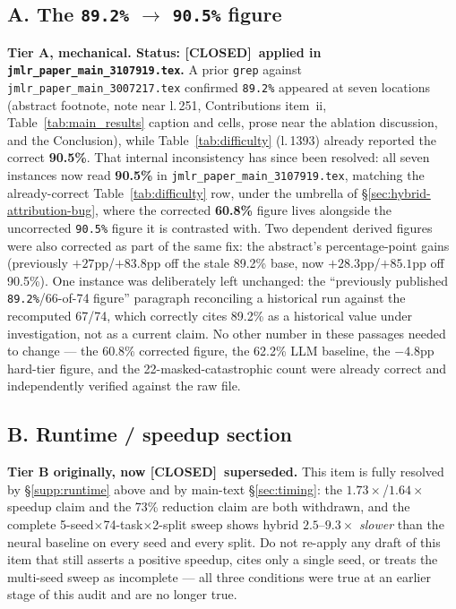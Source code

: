 \documentclass[11pt]{article}
\newcommand{\closed}{\textcolor{green!40!black}{\textbf{[CLOSED]}}}
\begin{document}
\subsection*{A. The \texttt{89.2\%} $\to$ \texttt{90.5\%} figure}

\textbf{Tier A, mechanical. Status: \closed\ applied in
\texttt{jmlr\_paper\_main\_3107919.tex}.} A prior
\texttt{grep} against
\texttt{jmlr\_paper\_main\_3007217.tex} confirmed \texttt{89.2\%} appeared
at seven locations (abstract footnote, note near
l.\,251, Contributions item~ii, Table~\ref{tab:main_results} caption and
cells, prose near the ablation discussion, and the Conclusion), while
Table~\ref{tab:difficulty} (l.\,1393) already reported the correct
\textbf{90.5\%}. That internal inconsistency has since been resolved: all
seven instances now read \textbf{90.5\%} in
\texttt{jmlr\_paper\_main\_3107919.tex}, matching the already-correct
Table~\ref{tab:difficulty} row, under the umbrella of
\S\ref{sec:hybrid-attribution-bug}, where the corrected \textbf{60.8\%}
figure lives alongside the uncorrected \texttt{90.5\%} figure it is
contrasted with. Two dependent derived figures were also corrected as
part of the same fix: the abstract's percentage-point gains (previously
$+27$pp/$+83.8$pp off the stale 89.2\% base, now $+28.3$pp/$+85.1$pp off
90.5\%). One instance was deliberately left unchanged: the
``previously published \texttt{89.2\%}/66-of-74 figure'' paragraph
reconciling a historical run against the recomputed 67/74, which
correctly cites 89.2\% as a historical value under investigation, not as
a current claim. No other number in these passages needed to
change --- the 60.8\% corrected figure, the 62.2\% LLM baseline, the
$-4.8$pp hard-tier figure, and the 22-masked-catastrophic count were
already correct and independently verified against the raw file.

\subsection*{B. Runtime / speedup section}

\textbf{Tier B originally, now \closed\ superseded.} This item is fully
resolved by \S\ref{supp:runtime} above and by main-text
\S\ref{sec:timing}: the $1.73\times$/$1.64\times$ speedup claim and the
73\% reduction claim are both withdrawn, and the complete
5-seed$\times$74-task$\times$2-split sweep shows hybrid $2.5$--$9.3\times$
\emph{slower} than the neural baseline on every seed and every split. Do
not re-apply any draft of this item that still asserts a positive
speedup, cites only a single seed, or treats the multi-seed sweep as
incomplete --- all three conditions were true at an earlier stage of this
audit and are no longer true.
\end{document}

